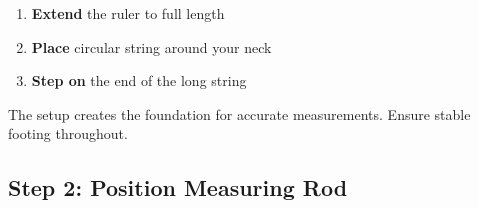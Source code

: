 \documentclass[11pt,a4paper]{article}
\begin{document}
\begin{multicols}{2}
    \columnbreak
    
    \begin{enumerate}[noitemsep]
        \item \textbf{Extend} the ruler to full length
        \item \textbf{Place} circular string around your neck
        \item \textbf{Step on} the end of the long string
    \end{enumerate}

    The setup creates the foundation for accurate measurements. Ensure stable footing throughout.
\end{multicols}
\newpage

\subsection{Step 2: Position Measuring Rod}
\end{document}
